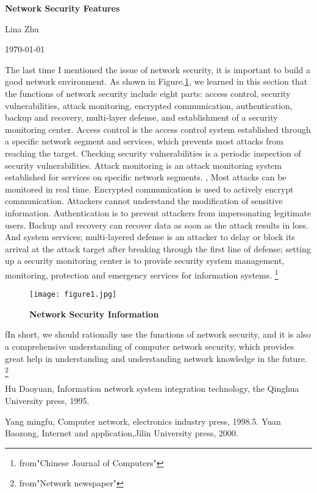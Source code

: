 \documentclass[a4paper,12pt,twocolumn]{article}
\begin{document}
	\begin{center}
		
		{\bfseries \LARGE  Network Security Features} 
		
	\end{center}
	\begin{center}
		Lina Zhu
	\end{center}
	\begin{center}
		\today
	\end{center}
	
	\par The last time I mentioned the issue of network security, it is important to build a good network environment. As shown in Figure.\ref{pic1}, we learned in this section that the functions of network security include eight parts: access control, security vulnerabilities, attack monitoring, encrypted communication, authentication, backup and recovery, multi-layer defense, and establishment of a security monitoring center. Access control is the access control system established through a specific network segment and services, which prevents most attacks from reaching the target. Checking security vulnerabilities is a periodic inspection of security vulnerabilities. Attack monitoring is an attack monitoring system established for services on specific network segments. , Most attacks can be monitored in real time. Encrypted communication is used to actively encrypt communication. Attackers cannot understand the modification of sensitive information. Authentication is to prevent attackers from impersonating legitimate users. Backup and recovery can recover data as soon as the attack results in loss. And system services; multi-layered defense is an attacker to delay or block its arrival at the attack target after breaking through the first line of defense; setting up a security monitoring center is to provide security system management, monitoring, protection and emergency services for information systems.
	\footnote{from"Chinese Journal of Computers"} 
	\begin{figure}[htp]
		\centering
		\texttt{[image: figure1.jpg]}
		\caption{\bfseries{Network Security Information}}\label{pic1}
	\end{figure}
\par fIn short, we should rationally use the functions of network security, and it is also a comprehensive understanding of computer network security, which provides great help in understanding and understanding network knowledge in the future.
\footnote{from"Network newspaper"} 
	\begin{thebibliography}{99}
	   Hu Daoyuan, Information network system integration technology, the Qinghua University press, 1995.
	
	   Yang mingfu, Computer network, electronics industry press, 1998.5.
	   Yuan Baozong, Internet and application,Jilin University press, 2000.
\end{thebibliography}
\end{document}
